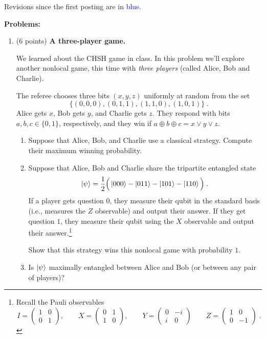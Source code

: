 \documentclass[12pt]{article}
\begin{document}
Revisions since the first posting are in \textcolor{blue}{blue}.

{\bf Problems:}
\begin{enumerate}



\item {(6 points)} {\bf A three-player game.}

We learned about the CHSH game in class. In this problem we'll explore another nonlocal game, this time with \emph{three players} (called Alice, Bob and Charlie).

The referee chooses three bits $(x,y,z)$ uniformly at random from the set 
\[\big\{ (0,0,0), (0,1,1), (1,1,0), (1,0,1) \big\}\;.\] 
Alice gets $x$, Bob gets $y$, and Charlie gets $z$. They respond with bits $a,b,c \in \{0,1\}$, respectively, and they win if $a \oplus b \oplus c = x \vee y \vee z$. 
\begin{enumerate}
\item Suppose that Alice, Bob, and Charlie use a classical strategy. Compute their maximum winning probability.
\item Suppose that Alice, Bob and Charlie share the tripartite entangled state 
\[
    \ket{\psi} = \frac{1}{2} \Big( \ket{000} - \ket{011} - \ket{101} - \ket{110} \Big) \;.
\]
If a player gets question $0$, they measure their qubit in the standard basis (i.e., measures the $Z$ observable) and output their answer. If they get question $1$, they measure their qubit using the $X$ observable and output their answer.\footnote{Recall the Pauli observables
\[
     I = \begin{pmatrix} 1 & 0 \\ 0 & 1 \end{pmatrix}, \qquad X = \begin{pmatrix} 0 & 1 \\ 1 & 0 \end{pmatrix}, \qquad Y = \begin{pmatrix} 0 & -i \\ i & 0 \end{pmatrix} \qquad Z = \begin{pmatrix} 1 & 0 \\ 0 & -1 \end{pmatrix}\;.
\]
}

Show that this strategy wins this nonlocal game with probability $1$.
\item Is $\ket{\psi}$ maximally entangled between Alice and Bob (or between any pair of players)? 
\end{enumerate}




\end{enumerate}
\end{document}
